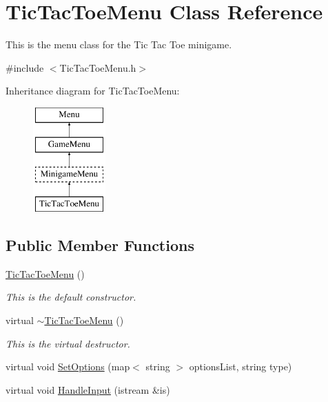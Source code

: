 \hypertarget{classTicTacToeMenu}{\section{Tic\-Tac\-Toe\-Menu Class Reference}
\label{classTicTacToeMenu}
}


This is the menu class for the Tic Tac Toe minigame.  




{\ttfamily \#include $<$Tic\-Tac\-Toe\-Menu.\-h$>$}

Inheritance diagram for Tic\-Tac\-Toe\-Menu\-:\begin{figure}[H]
\begin{center}
\leavevmode
\includegraphics[height=4.000000cm]{classTicTacToeMenu}
\end{center}
\end{figure}
\subsection*{Public Member Functions}
\begin{DoxyCompactItemize}
\item 
\hyperlink{classTicTacToeMenu_a15e92bc5e44266bbc23bbce421186dad}{Tic\-Tac\-Toe\-Menu} ()
\begin{DoxyCompactList}\small\item\em This is the default constructor. \end{DoxyCompactList}\item 
virtual \hyperlink{classTicTacToeMenu_a5891833049463c13ca5115206b4e1340}{$\sim$\-Tic\-Tac\-Toe\-Menu} ()
\begin{DoxyCompactList}\small\item\em This is the virtual destructor. \end{DoxyCompactList}\item 
virtual void \hyperlink{classTicTacToeMenu_abca85aca55ec72762b89be641b38ea5f}{Set\-Options} (map$<$ string $>$ options\-List, string type)
\item 
virtual void \hyperlink{classTicTacToeMenu_a086c624e37acf777dd89a63575c07236}{Handle\-Input} (istream \&is)
\end{DoxyCompactItemize}
